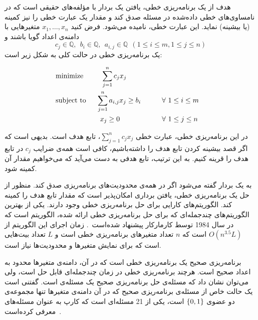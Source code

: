 
هدف از یک برنامه‌ریزی خطی، یافتن یک بردار با مؤلفه‌های حقیقی است که در نامساوی‌های خطی داده‌شده در مسئله صدق کند و مقدار یک عبارت خطی را نیز کمینه (یا بیشینه) نماید. این عبارت خطی،  نامیده می‌شود. فرض کنید $x_{1}, \ldots, x_{n}$ متغیر‌هایی با دامنه‌ی اعداد گویا باشند و
$$c_{j} \in \mathbb{Q}, \ \ b_i \in \mathbb{Q}, \ \ a_{i, j} \in \mathbb{Q} \ \ (1 \leq i \leq m, 1 \leq j \leq n)$$
یک برنامه‌ریزی خطی در حالت کلی به شکل زیر است:
\begin{latin}
\begin{alignat}{3}
    & \text{minimize}  \quad && \ {\sum_{j=1}^{n} {c_{j} x_{j}}} \notag \\
    & \text{subject to}  \quad 
		&& \!\!{\sum_{j=1}^{n} {a_{i, j} x_{j}} \geq b_{i}} && \qquad {\forall \ 1 \leq i \leq m} \notag \\
    		&&& x_{j} \geq 0 && \qquad {\forall \ 1 \leq j \leq n} \notag
\end{alignat}
\end{latin}


در این برنامه‌ریزی خطی، عبارت خطی $\sum_{j=1}^{n} {c_{j} x_{j}}$، تابع هدف است. بدیهی است که اگر قصد بیشینه کردن تابع هدف را داشته‌باشیم، کافی است همه‌ی ضرایب $c_j$ در تابع هدف را قرینه کنیم. به این ترتیب، تابع هدفی به دست می‌آید که می‌خواهیم مقدار آن کمینه شود.

به یک بردار  گفته می‌شود اگر در همه‌ی محدودیت‌های برنامه‌ریزی صدق کند. منظور از حل یک برنامه‌ریزی خطی، یافتن برداری امکان‌پذیر است که مقدار تابع هدف را کمینه کند. الگوریتم‌های کارایی برای حل برنامه‌ریزی خطی وجود دارند. یکی از بهترین الگوریتم‌های چند‌جمله‌ای که برای حل برنامه‌ریزی خطی ارائه شده، الگوریتم
است که در سال 1984 توسط کارمارکار پیشنهاد شده‌است~\cite{LP-poly}. زمان اجرای این الگوریتم از $O(n^{3.5} L )$ است که $n$ تعداد متغیر‌های برنامه‌ریزی خطی است و $L$ تعداد بیت‌هایی است که برای نمایش متغیر‌ها و محدودیت‌ها نیاز است.


برنامه‌ریزی صحیح یک برنامه‌ریزی خطی است که در آن، دامنه‌ی متغیر‌ها محدود به اعداد صحیح است. هر‌چند برنامه‌ریزی‌ خطی در زمان چند‌جمله‌ای قابل حل است، ولی می‌توان نشان داد که مسئله‌ی حل برنامه‌ریزی صحیح یک مسئله‌ی  است. گفتنی است یک حالت خاص از مسئله‌ی برنامه‌ریزی صحیح که در آن دامنه‌ی متغیر‌ها تنها مجموعه‌ی دو عضوی ${\{ 0, 1 \}}$ است، یکی از 21 مسئله‌ای است که کارپ به عنوان مسئله‌های  معرفی کرده‌است~\cite{Karp}.


